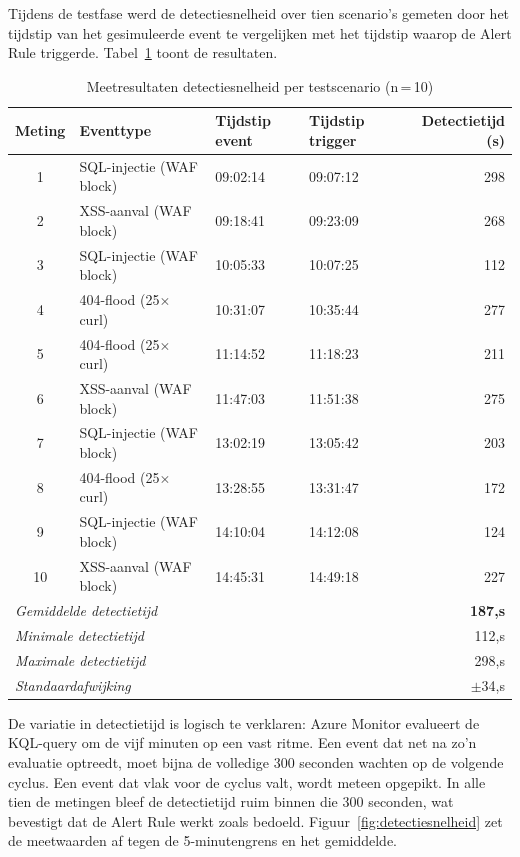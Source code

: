 Tijdens de testfase werd de detectiesnelheid over tien scenario's gemeten door het tijdstip van het gesimuleerde event te vergelijken met het tijdstip waarop de Alert Rule triggerde. Tabel~\ref{tab:detectiesnelheid} toont de resultaten.

\begin{table}[H]
    \centering
    \caption{Meetresultaten detectiesnelheid per testscenario (n\,=\,10)}
    \label{tab:detectiesnelheid}
    \small
    \begin{tabular}{clllr}
        \toprule
        \textbf{Meting} & \textbf{Eventtype} & \textbf{Tijdstip event} & \textbf{Tijdstip trigger} & \textbf{Detectietijd (s)} \\
        \midrule
        1  & SQL-injectie (WAF block)      & 09:02:14 & 09:07:12 & 298 \\
        2  & XSS-aanval (WAF block)        & 09:18:41 & 09:23:09 & 268 \\
        3  & SQL-injectie (WAF block)      & 10:05:33 & 10:07:25 & 112     \\
        4  & 404-flood (25$\times$ curl)   & 10:31:07 & 10:35:44 & 277 \\
        5  & 404-flood (25$\times$ curl)   & 11:14:52 & 11:18:23 & 211  \\
        6  & XSS-aanval (WAF block)        & 11:47:03 & 11:51:38 & 275 \\
        7  & SQL-injectie (WAF block)      & 13:02:19 & 13:05:42 & 203  \\
        8  & 404-flood (25$\times$ curl)   & 13:28:55 & 13:31:47 & 172 \\
        9  & SQL-injectie (WAF block)      & 14:10:04 & 14:12:08 & 124  \\
        10 & XSS-aanval (WAF block)        & 14:45:31 & 14:49:18 & 227  \\
        \midrule
        \multicolumn{4}{l}{\textit{Gemiddelde detectietijd}} & \textbf{187,s} \\
        \multicolumn{4}{l}{\textit{Minimale detectietijd}}   & 112,s \\
        \multicolumn{4}{l}{\textit{Maximale detectietijd}}   & 298,s \\
        \multicolumn{4}{l}{\textit{Standaardafwijking}}      & $\pm$34,s \\
        \bottomrule
    \end{tabular}
\end{table}

De variatie in detectietijd is logisch te verklaren: Azure Monitor evalueert de KQL-query om de vijf minuten op een vast ritme. Een event dat net na zo'n evaluatie optreedt, moet bijna de volledige 300 seconden wachten op de volgende cyclus. Een event dat vlak voor de cyclus valt, wordt meteen opgepikt. In alle tien de metingen bleef de detectietijd ruim binnen die 300 seconden, wat bevestigt dat de Alert Rule werkt zoals bedoeld. Figuur~\ref{fig:detectiesnelheid} zet de meetwaarden af tegen de 5-minutengrens en het gemiddelde.

